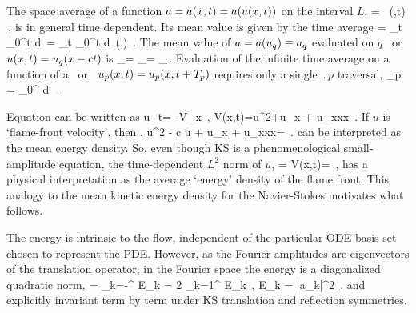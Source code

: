 The {space average} of a function $a = a(x,t) = a(u(x,t))$  on
the interval $L$,
\beq
    \expct{\obser} = \Lint{\pSpace}\, \obser(\pSpace,t)
    \,,
    \label{rpo:spac_ave}
\eeq
is in general time dependent.
Its mean value is given by the {time average}
\beq
\timeAver{\obser}
    =
\lim_{t\rightarrow \infty}  \int_0^t \! d\tau \, \expct{\obser}
    =
\lim_{t\rightarrow \infty}  \int_0^t \!
    \Lint{\tau}  d\pSpace\, \obser(\pSpace,\tau)
    \,.
\label{rpo:tim_ave}
\eeq
The mean value of $a = a(u_q) \equiv a_q$ evaluated on $q$
\eqv\ or {\reqv} $u(x,t) = u_q(x-ct)$ is
\beq
\timeAver{\obser}_\stagn = \expct{\obser}_\stagn = \obser_\stagn\,.
\label{rpo:u-eqv} \eeq Evaluation of the infinite time average
 on a function of a \po\ or \rpo\
$u_p(x,t)=u_p(x,t+{T_{p}})$ requires only a single
$\period{p}$ traversal,
\beq
  \timeAver{\obser}_p = 
    \int_0^{\period{p}} \! d\tau \, \expct{\obser}
\,.
\label{rpo:u-cyc}
\eeq

Equation  can be written as
\beq
    u_t=- V_x
        \,,\qquad
    V(x,t)={\textstyle{}}u^2+u_{x} + u_{xxx}
    \,.
If $u$ is `flame-front velocity', then \expctE,
\beq
{\textstyle{}}u^2 - c u + u_x + u_{xxx}=\expctE
\,.
\label{eq:stdks}
\eeq
can be interpreted as the mean energy
density. So, even though KS is a phenomenological
small-amplitude equation, the time-dependent {$L^2$ norm
of $u$},
\beq
    \expctE=
  \Lint{\pSpace}
  V(x,t)=
  \Lint{\pSpace} 
  \,,
  \label{ksEnergy}
\eeq
has a physical interpretation as the average `energy'
density of the flame front. This analogy to the mean kinetic energy
density for the Navier-Stokes motivates what follows.

The energy  is intrinsic to the flow,
independent of the particular ODE basis set chosen to
represent the PDE. However, as the Fourier amplitudes are
eigenvectors of the translation operator, in the Fourier
space the energy is a diagonalized quadratic norm,
\beq
\expctE
          =  \sum_{k=-\infty}^{\infty} E_k
          = 2 \sum_{k=1}^{\infty} E_k
\,,\qquad
E_k =
    {\textstyle{}}|a_k|^2
\,,
and explicitly invariant term by term
under KS translation
and reflection symmetries.

